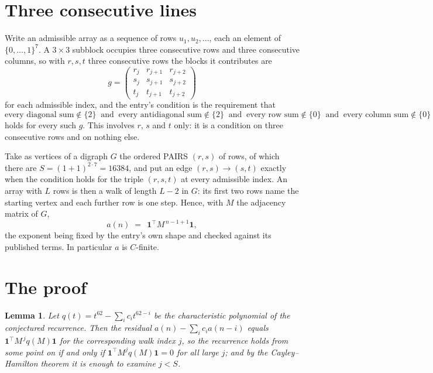 \documentclass[11pt,a4paper]{article}
\theoremstyle{plain}
\newtheorem{lemma}[theorem]{Lemma}
\theoremstyle{definition}
\begin{document}
\section{Three consecutive lines}

Write an admissible array as a sequence of rows $u_1,u_2,\dots$, each an element of
$\{0,\dots,1\}^{7}$. A $3\times3$ subblock occupies three consecutive rows and
three consecutive columns, so with $r,s,t$ three consecutive rows the blocks it
contributes are
\[
g=\begin{pmatrix}r_j&r_{j+1}&r_{j+2}\\ s_j&s_{j+1}&s_{j+2}\\ t_j&t_{j+1}&t_{j+2}\end{pmatrix}
\]
for each admissible index, and the entry's condition is the requirement that
\[
\text{every diagonal sum} \notin \{2\}\ \text{ and }\ \text{every antidiagonal sum} \notin \{2\}\ \text{ and }\ \text{every row sum} \notin \{0\}\ \text{ and }\ \text{every column sum} \notin \{0\}
\]
holds for every such $g$. This involves $r$, $s$ and $t$ only: it is a condition on
three consecutive rows and on nothing else.

Take as vertices of a digraph $G$ the ordered PAIRS $(r,s)$ of rows, of which there are
$S=(1+1)^{2\cdot7}=16384$, and put an edge $(r,s)\to(s,t)$ exactly when the condition
holds for the triple $(r,s,t)$ at every admissible index. An array with $L$ rows is then a
walk of length $L-2$ in $G$: its first two rows name the starting vertex and each further
row is one step. Hence, with $M$ the adjacency matrix of $G$,
\[
a(n)\;=\;\,\mathbf{1}^{\!\top}M^{\,n-1+1}\mathbf{1},
\]
the exponent being fixed by the entry's own shape and checked against its published terms.
In particular $a$ is $C$-finite.

\section{The proof}

\begin{lemma}\label{lem:crit}
Let $q(t)=t^{62}-\sum_i c_it^{62-i}$ be the characteristic polynomial of the
conjectured recurrence. Then the residual $a(n)-\sum_ic_ia(n-i)$ equals
$\mathbf{1}^{\!\top}M^{\,j}q(M)\mathbf{1}$ for the corresponding walk index
$j$, so the recurrence holds from some point on if and only if
$\mathbf{1}^{\!\top}M^{j}q(M)\mathbf{1}=0$ for all large $j$; and by the
Cayley--Hamilton theorem it is enough to examine $j<S$.
\end{lemma}
\end{document}
